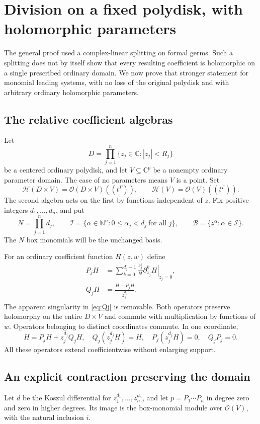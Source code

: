 \documentclass[11pt,letterpaper]{article}
\theoremstyle{definition}
\theoremstyle{remark}
\newcommand{\C}{\mathbb C}
\newcommand{\N}{\mathbb N}
\newcommand{\HH}{\mathscr H}
\newcommand{\OO}{\mathcal O}
\numberwithin{equation}{section}
\begin{document}
\section{Division on a fixed polydisk, with holomorphic parameters}\label{sec:polydisk}
The general proof used a complex-linear splitting on formal germs. Such a splitting does not by itself show that every resulting coefficient is holomorphic on a single prescribed ordinary domain. We now prove that stronger statement for monomial leading systems, with no loss of the original polydisk and with arbitrary ordinary holomorphic parameters.

\subsection{The relative coefficient algebras}
Let
\[
 D=\prod_{j=1}^n\{z_j\in\C:|z_j|<R_j\}
\]
be a centered ordinary polydisk, and let $V\subseteq\C^p$ be a nonempty ordinary parameter domain. The case of no parameters means $V$ is a point. Set
\[
 \HH(D\times V)=\OO(D\times V)((t^\Gamma)),\qquad
 \HH(V)=\OO(V)((t^\Gamma)).
\]
The second algebra acts on the first by functions independent of $z$. Fix positive integers $d_1,\ldots,d_n$, and put
\[
 N=\prod_{j=1}^n d_j,\qquad
 \mathcal I=\{\alpha\in\N^n:0\leq\alpha_j<d_j\ \text{for all }j\},
 \qquad\mathcal B=\{z^\alpha:\alpha\in\mathcal I\}.
\]
The $N$ box monomials will be the unchanged basis.

For an ordinary coefficient function $H(z,w)$ define
\begin{align}
 P_jH&=\sum_{k=0}^{d_j-1}\frac{z_j^k}{k!}
 \left.\partial_{z_j}^kH\right|_{z_j=0},\label{eq:Pj}\\
 Q_jH&=\frac{H-P_jH}{z_j^{d_j}}.\label{eq:Qj}
\end{align}
The apparent singularity in \eqref{eq:Qj} is removable. Both operators preserve holomorphy on the entire $D\times V$ and commute with multiplication by functions of $w$. Operators belonging to distinct coordinates commute. In one coordinate,
\begin{equation}\label{eq:PQ}
 H=P_jH+z_j^{d_j}Q_jH,\quad
 Q_j(z_j^{d_j}H)=H,\quad P_j(z_j^{d_j}H)=0,\quad Q_jP_j=0.
\end{equation}
All these operators extend coefficientwise without enlarging support.

\subsection{An explicit contraction preserving the domain}
Let $d$ be the Koszul differential for $z_1^{d_1},\ldots,z_n^{d_n}$, and let $p=P_1\cdots P_n$ in degree zero and zero in higher degrees. Its image is the box-monomial module over $\OO(V)$, with the natural inclusion $i$.
\end{document}
